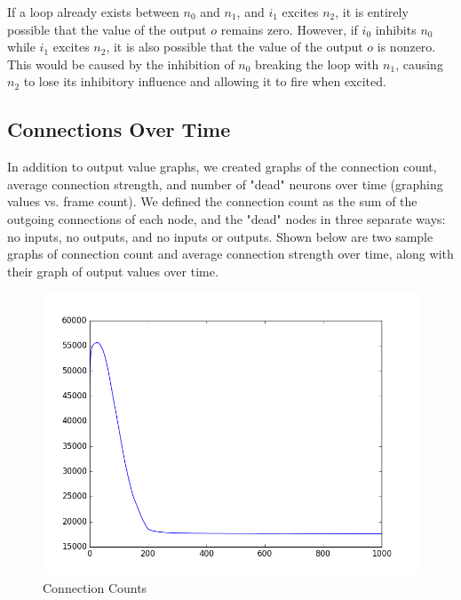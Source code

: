 \documentclass[12pt]{article}
\begin{document}
If a loop already exists between $n_0$ and $n_1$, and $i_1$ excites $n_2$, it is entirely possible that the value of the output $o$ remains zero.  However, if $i_0$ inhibits $n_0$ while $i_1$ excites $n_2$, it is also possible that the value of the output $o$ is nonzero.  This would be caused by the inhibition of $n_0$ breaking the loop with $n_1$, causing $n_2$ to lose its inhibitory influence and allowing it to fire when excited.

\subsection{Connections Over Time} \label{connectiongraphs}

In addition to output value graphs, we created graphs of the connection count, average connection strength, and number of "dead" neurons over time (graphing values vs. frame count). We defined the connection count as the sum of the outgoing connections of each node, and the "dead" nodes in three separate ways: no inputs, no outputs, and no inputs or outputs.  Shown below are two sample graphs of connection count and average connection strength over time, along with their graph of output values over time.

\begin{figure}[H]
    \includegraphics[width=\linewidth]{../visualizations/counts_lowrate1000frames.png}
    \caption{Connection Counts}
\end{figure}
\end{document}
